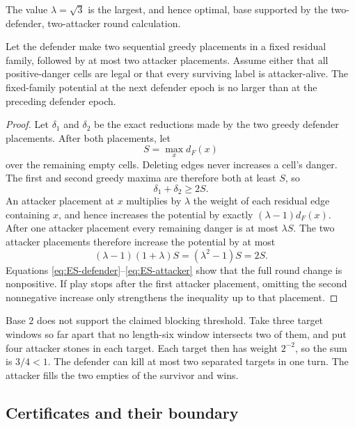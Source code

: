 The value $\lambda=\sqrt3$ is the largest, and hence optimal, base supported
by the two-defender, two-attacker round calculation.

\begin{lemma}
\label{lem:ES-L5}
Let the defender make two sequential greedy placements in a fixed residual
family, followed by at most two attacker placements.  Assume either that all
positive-danger cells are legal or that every surviving label is
attacker-alive.  The fixed-family potential at the next defender epoch is no
larger than at the preceding defender epoch.
\end{lemma}

\begin{proof}
Let $\delta_1$ and $\delta_2$ be the exact reductions made by the two greedy
defender placements.  After both placements, let
\[
  S=\max_x d_F(x)
\]
over the remaining empty cells.  Deleting edges never increases a cell's
danger.  The first and second greedy maxima are therefore both at least $S$,
so
\begin{equation}
  \delta_1+\delta_2\ge2S. \label{eq:ES-defender}
\end{equation}
An attacker placement at $x$ multiplies by $\lambda$ the weight of each
residual edge containing $x$, and hence increases the potential by exactly
$(\lambda-1)d_F(x)$.  After one attacker placement every remaining danger is
at most $\lambda S$.  The two attacker placements therefore increase the
potential by at most
\begin{equation}
  (\lambda-1)(1+\lambda)S
  =(\lambda^2-1)S=2S. \label{eq:ES-attacker}
\end{equation}
Equations \eqref{eq:ES-defender}--\eqref{eq:ES-attacker} show that the full
round change is nonpositive.  If play stops after the first attacker
placement, omitting the second nonnegative increase only strengthens the
inequality up to that placement.
\end{proof}

Base $2$ does not support the claimed blocking threshold.  Take three target
windows so far apart that no length-six window intersects two of them, and put
four attacker stones in each target.  Each target then has weight $2^{-2}$,
so the sum is $3/4<1$.  The defender can kill at most two separated targets
in one turn.  The attacker fills the two empties of the survivor and wins.

\subsection{Certificates and their boundary}


